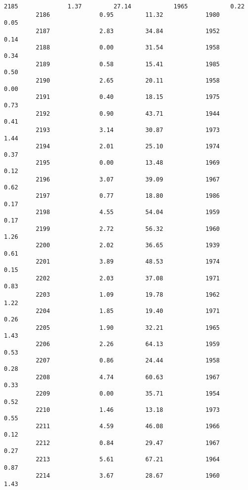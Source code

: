 \documentclass[11pt]{llncs}
\begin{document}
\begin{Verbatim}[commandchars=\\\{\}]
         2185              1.37         27.14            1965            0.22   
         2186              0.95         11.32            1980            0.05   
         2187              2.83         34.84            1952            0.14   
         2188              0.00         31.54            1958            0.34   
         2189              0.58         15.41            1985            0.50   
         2190              2.65         20.11            1958            0.00   
         2191              0.40         18.15            1975            0.73   
         2192              0.90         43.71            1944            0.41   
         2193              3.14         30.87            1973            1.44   
         2194              2.01         25.10            1974            0.37   
         2195              0.00         13.48            1969            0.12   
         2196              3.07         39.09            1967            0.62   
         2197              0.77         18.80            1986            0.17   
         2198              4.55         54.04            1959            0.17   
         2199              2.72         56.32            1960            1.26   
         2200              2.02         36.65            1939            0.61   
         2201              3.89         48.53            1974            0.15   
         2202              2.03         37.08            1971            0.83   
         2203              1.09         19.78            1962            1.22   
         2204              1.85         19.40            1971            0.26   
         2205              1.90         32.21            1965            1.43   
         2206              2.26         64.13            1959            0.53   
         2207              0.86         24.44            1958            0.28   
         2208              4.74         60.63            1967            0.33   
         2209              0.00         35.71            1954            0.52   
         2210              1.46         13.18            1973            0.55   
         2211              4.59         46.08            1966            0.12   
         2212              0.84         29.47            1967            0.27   
         2213              5.61         67.21            1964            0.87   
         2214              3.67         28.67            1960            1.43   
         

\end{Verbatim}
\end{document}
